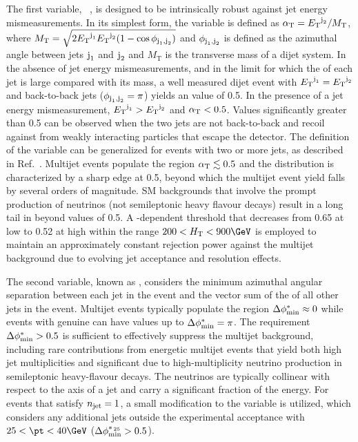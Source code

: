 The first variable, \alphat~\cite{Randall:2008rw, RA1Paper}, is
designed to be intrinsically robust against jet energy
mismeasurements. In its simplest form, the \alphat variable is defined
as $\alpha_{\text{T}} = {E_{\text T}}^{\text{j}_\text{2}}/M_\text{T}$, where $M_\textrm{T} = \sqrt{
  2 {E_{\text T}}^{\text{j}_\text{1}} {E_{\text T}}^{\text{j}_\text{2}} (1 - \cos\phi_{\text{j}_\text{1},\text{j}_\text{2}})}$ and
$\phi_{\text{j}_\text{1},\text{j}_\text{2}}$ is defined as the azimuthal angle between
jets $\text{j}_\text{1}$ and $\text{j}_\text{2}$ and $M_\textrm{T}$ is the transverse mass
of a dijet system. In the absence of jet energy mismeasurements, and
in the limit for which the \Et of each jet is large compared with its
mass, a well measured dijet event with ${E_{\text T}}^{\text{j}_\text{1}} = {E_{\text T}}^{\text{j}_\text{2}}$
and back-to-back jets ($\phi_{\text{j}_\text{1},\text{j}_\text{2}} = \pi$) yields an
\alphat value of 0.5. In the presence of a jet energy mismeasurement,
${E_{\text T}}^{\text{j}_\text{1}} > {E_{\text T}}^{\text{j}_\text{2}}$ and $\alpha_{\text{T}} < 0.5$. Values
significantly greater than 0.5 can be observed when the two jets are
not back-to-back and recoil against \ptvecmiss from weakly interacting
particles that escape the detector. The definition of the \alphat
variable can be generalized for events with two or more jets, as
described in Ref.~\cite{RA1Paper}. Multijet events populate the region
$\alpha_{\text{T}} \lesssim 0.5$ and the \alphat distribution is characterized
by a sharp edge at 0.5, beyond which the multijet event yield falls by
several orders of magnitude. SM backgrounds that involve the prompt
production of neutrinos (\eg not semileptonic heavy flavour decays)
result in a long tail in \alphat beyond values of 0.5. A
\scalht-dependent \alphat threshold that decreases from 0.65 at low
\scalht to 0.52 at high \scalht within the range $200 < \scalht <
900\GeV$ is employed to maintain an approximately constant rejection
power against the multijet background due to evolving jet acceptance
and resolution effects.

The second variable, known as \bdphi, considers the minimum azimuthal
angular separation between each jet in the event and the vector sum of
the \pt of all other jets in the event. Multijet events typically
populate the region $\Delta\phi^{*}_\text{min} \approx 0$ while events with genuine
\ptvecmiss can have values up to $\Delta\phi^{*}_\text{min} = \pi$. The requirement
$\Delta\phi^{*}_\text{min} > 0.5$ is sufficient to effectively suppress the multijet
background, including rare contributions from energetic multijet
events that yield both high jet multiplicities and significant
\ptvecmiss due to high-multiplicity neutrino production in
semileptonic heavy-flavour decays. The neutrinos are typically
collinear with respect to the axis of a jet and carry a significant
fraction of the energy. For events that satisfy $n_{\text{jet}} = 1$, a small
modification to the \bdphi variable is utilized, which considers any
additional jets outside the experimental acceptance with $25 < \pt <
40\GeV$ ($\Delta\phi^{*_{\, 25}}_\text{min} > 0.5$).

